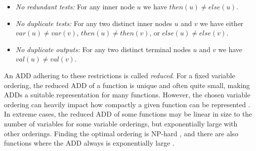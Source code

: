 \begin{itemize}
	\item \textit{No redundant tests:} For any inner node $u$ we have $\mathit{then}(u) \neq \mathit{else}(u)$.
	\item \textit{No duplicate tests:} For any two distinct inner nodes $u$ and $v$ we have either $\mathit{var}(u) \neq \mathit{var}(v)$, $\mathit{then}(u) \neq \mathit{then}(v)$, or $\mathit{else}(u) \neq \mathit{else}(v)$. \label{DD:no_dups}
	\item \textit{No duplicate outputs:} For any two distinct terminal nodes $u$ and $v$ we have $\mathit{val}(u) \neq \mathit{val}(v)$.
\end{itemize}
An ADD adhering to these restrictions is called \textit{reduced}.
For a fixed variable ordering, the reduced ADD of a function is unique and often quite small, making ADDs a suitable representation for many functions.
%
However, the chosen variable ordering can heavily impact how compactly a given function can be represented \cite{bryant1986bdd}.
In extreme cases, the reduced ADD of some functions may be linear in size to the number of variables for some variable orderings, but exponentially large with other orderings.
Finding the optimal ordering is NP-hard \cite{bollig1996improving}, and there are also functions where the ADD always is exponentially large \cite{bryant1986bdd}.


